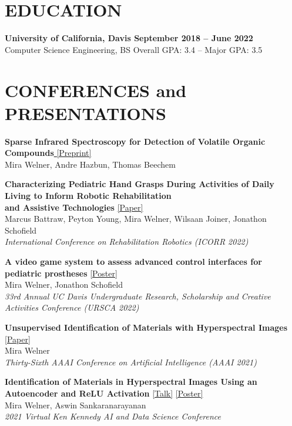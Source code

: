 \documentclass[a4paper]{comcv}
\begin{document}
\section{EDUCATION}
\begin{flushleft}
{\bf University of California, Davis \hfill September 2018 -- June 2022}
\\{Computer Science Engineering, BS \hfill {Overall GPA: 3.4 -- Major GPA: 3.5}}
\end{flushleft}

\section{CONFERENCES and PRESENTATIONS}
\noindent\small\textbf{Sparse Infrared Spectroscopy for Detection of Volatile Organic Compounds}\href{https://arxiv.org/abs/2506.20678}{   [Preprint]}\\
\indent Mira Welner, Andre Hazbun, Thomas Beechem

\noindent\small\textbf{Characterizing Pediatric Hand Grasps During Activities of Daily Living to Inform
Robotic Rehabilitation \\and Assistive Technologies }\href{https://pubmed.ncbi.nlm.nih.gov/36176073/}{  [Paper]}\\
\indent Marcus Battraw, Peyton Young, Mira Welner, Wilsaan Joiner, Jonathon Schofield\\
\indent \textit{International Conference on Rehabilitation Robotics (ICORR 2022)}

\noindent\textbf{A video game system to assess advanced control interfaces for pediatric prostheses  }\href{https://burningsilicon.dev/docs/schofield_presentation.pdf}{  [Poster]}\\
\indent Mira Welner, Jonathon Schofield\\
\indent \textit{33rd Annual UC Davis Undergraduate Research, Scholarship and Creative Activities Conference (URSCA 2022)}

\noindent\textbf{Unsupervised Identification of Materials with Hyperspectral Images } \href{https://ojs.aaai.org/index.php/AAAI/article/view/21708}{  [Paper]}\\
\indent Mira Welner\\
\indent \textit{Thirty-Sixth AAAI Conference on Artificial Intelligence (AAAI 2021)}

\noindent\textbf{Identification of Materials in Hyperspectral Images Using an Autoencoder and ReLU Activation } \href{https://youtu.be/CvCrZSAqwbI}{[Talk]}   \href{https://burningsilicon.dev/docs/rice_poster}{[Poster]}\\
\indent Mira Welner, Aswin Sankaranarayanan\\
\indent \textit{2021 Virtual Ken Kennedy AI and Data Science Conference}
\end{document}
